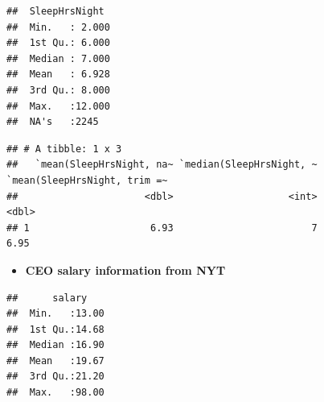 \documentclass[
]{book}
\newenvironment{Shaded}{\begin{snugshade}}{\end{snugshade}}
\newcommand{\CommentTok}[1]{\textcolor[rgb]{0.56,0.35,0.01}{\textit{#1}}}
\newcommand{\DataTypeTok}[1]{\textcolor[rgb]{0.13,0.29,0.53}{#1}}
\newcommand{\FloatTok}[1]{\textcolor[rgb]{0.00,0.00,0.81}{#1}}
\newcommand{\KeywordTok}[1]{\textcolor[rgb]{0.13,0.29,0.53}{\textbf{#1}}}
\newcommand{\NormalTok}[1]{#1}
\newcommand{\OperatorTok}[1]{\textcolor[rgb]{0.81,0.36,0.00}{\textbf{#1}}}
\newcommand{\OtherTok}[1]{\textcolor[rgb]{0.56,0.35,0.01}{#1}}
\newcommand{\StringTok}[1]{\textcolor[rgb]{0.31,0.60,0.02}{#1}}
\providecommand{\tightlist}{%
  \setlength{\itemsep}{0pt}\setlength{\parskip}{0pt}}
\begin{document}
\begin{verbatim}
##  SleepHrsNight   
##  Min.   : 2.000  
##  1st Qu.: 6.000  
##  Median : 7.000  
##  Mean   : 6.928  
##  3rd Qu.: 8.000  
##  Max.   :12.000  
##  NA's   :2245
\end{verbatim}

\begin{Shaded}
\end{Shaded}

\begin{verbatim}
## # A tibble: 1 x 3
##   `mean(SleepHrsNight, na~ `median(SleepHrsNight, ~ `mean(SleepHrsNight, trim =~
##                      <dbl>                    <int>                        <dbl>
## 1                     6.93                        7                         6.95
\end{verbatim}

\begin{Shaded}
\end{Shaded}

\begin{itemize}
\tightlist
\item
  \textbf{CEO salary information from NYT}
\end{itemize}

\begin{Shaded}
\end{Shaded}

\begin{verbatim}
##      salary     
##  Min.   :13.00  
##  1st Qu.:14.68  
##  Median :16.90  
##  Mean   :19.67  
##  3rd Qu.:21.20  
##  Max.   :98.00
\end{verbatim}
\end{document}

